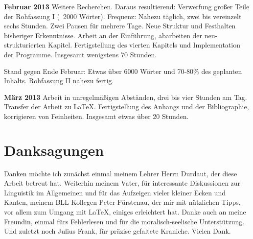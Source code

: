 \documentclass[12pt,a4paper]{article}
\theoremstyle{definition}
\begin{document}
	\textbf{Februar 2013}
		Weitere Recherchen. Daraus resultierend: Verwerfung großer Teile der Rohfassung I (~2000 Wörter).
		Frequenz: Nahezu täglich, zwei bis vereinzelt sechs Stunden. Zwei Pausen für mehrere Tage. Neue Struktur und Festhalten bisheriger Erkenntnisse. Arbeit an der Einführung, abarbeiten der neu-strukturierten Kapitel. Fertigstellung des vierten Kapitels und Implementation der Programme.
		Insgesamt wenigstens 70 Stunden.
		
		Stand gegen Ende Februar: Etwas über 6000 Wörter und 70-80\% des geplanten Inhalts. Rohfassung II nahezu fertig.
	
	\textbf{März 2013}
		Arbeit in unregelmäßigen Abständen, drei bis vier Stunden am Tag. Transfer der Arbeit zu LaTeX. Fertigstellung des Anhangs und der Bibliographie, korrigieren von Feinheiten. Insgesamt etwas über 20 Stunden.

\section{Danksagungen}
	Danken möchte ich zunächst einmal meinem Lehrer Herrn Durdaut, der diese Arbeit betreut hat. Weiterhin meinem Vater, für interessante Diskussionen zur Linguistik im Allgemeinen und für das Aufzeigen vieler kleiner Ecken und Kanten, meinem BLL-Kollegen Peter Fürstenau, der mir mit nützlichen Tipps, vor allem zum Umgang mit LaTeX, einiges erleichtert hat. Danke auch an meine Freundin, einmal fürs Fehlerlesen und für die moralisch-seelische Unterstützung. Und zuletzt noch Julius Frank, für präzise gefaltete Kraniche. Vielen Dank.
\end{document}
